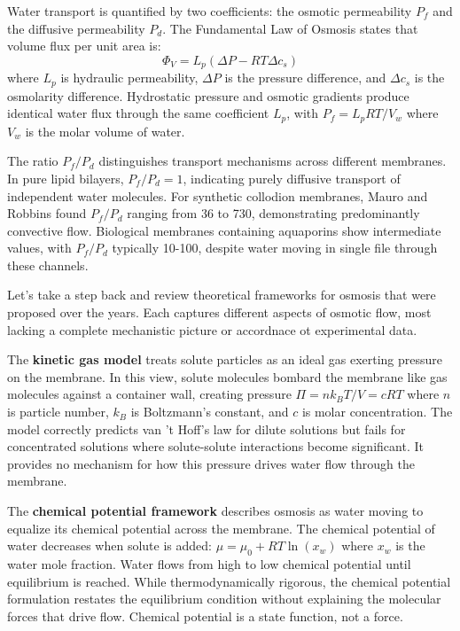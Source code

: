 Water transport is quantified by two coefficients: the osmotic permeability $P_f$ and the diffusive permeability $P_d$. The Fundamental Law of Osmosis states that volume flux per unit area is:
\[
\Phi_V = L_p(\Delta P - RT\Delta c_s)
\]
where $L_p$ is hydraulic permeability, $\Delta P$ is the pressure difference, and $\Delta c_s$ is the osmolarity difference. Hydrostatic pressure and osmotic gradients produce identical water flux through the same coefficient $L_p$, with $P_f = L_p RT/V_w$ where $V_w$ is the molar volume of water.

The ratio $P_f/P_d$ distinguishes transport mechanisms across different membranes. In pure lipid bilayers, $P_f/P_d = 1$, indicating purely diffusive transport of independent water molecules. For synthetic collodion membranes, Mauro and Robbins found $P_f/P_d$ ranging from 36 to 730, demonstrating predominantly convective flow. Biological membranes containing aquaporins show intermediate values, with $P_f/P_d$ typically 10-100, despite water moving in single file through these channels.

Let's take a step back and review theoretical frameworks for osmosis that were proposed over the years. Each captures different aspects of osmotic flow, most lacking a complete mechanistic picture or accordnace ot experimental data.

The \textbf{kinetic gas model} treats solute particles as an ideal gas exerting pressure on the membrane. In this view, solute molecules bombard the membrane like gas molecules against a container wall, creating pressure $\Pi = nk_B T/V = cRT$ where $n$ is particle number, $k_B$ is Boltzmann's constant, and $c$ is molar concentration. The model correctly predicts van 't Hoff's law for dilute solutions but fails for concentrated solutions where solute-solute interactions become significant. It provides no mechanism for how this pressure drives water flow through the membrane.

The \textbf{chemical potential framework} describes osmosis as water moving to equalize its chemical potential across the membrane. The chemical potential of water decreases when solute is added: $\mu = \mu_0 + RT \ln(x_w)$ where $x_w$ is the water mole fraction. Water flows from high to low chemical potential until equilibrium is reached. While thermodynamically rigorous, the chemical potential formulation restates the equilibrium condition without explaining the molecular forces that drive flow. Chemical potential is a state function, not a force.

